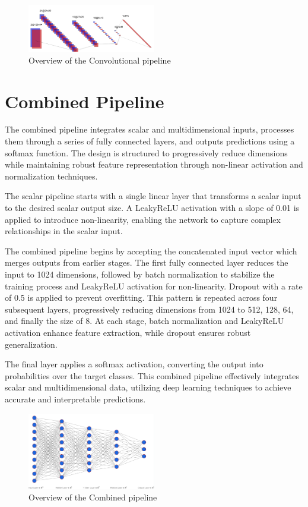 \documentclass[twocolumn]{article}
\begin{document}
\begin{figure}[h]
  \centering
  \includegraphics[width=0.5\textwidth]{Conv-Pipeline}
  \caption{Overview of the Convolutional pipeline}
  \label{fig:Conv-Pipeline}
\end{figure}

\section{Combined Pipeline}
The combined pipeline integrates scalar and multidimensional inputs, processes them through a series of fully connected layers, and outputs predictions using a softmax function. The design is structured to progressively reduce dimensions while maintaining robust feature representation through non-linear activation and normalization techniques.

The scalar pipeline starts with a single linear layer that transforms a scalar input to the desired scalar output size. A LeakyReLU activation with a slope of 0.01 is applied to introduce non-linearity, enabling the network to capture complex relationships in the scalar input.

The combined pipeline begins by accepting the concatenated input vector which merges outputs from earlier stages. The first fully connected layer reduces the input to 1024 dimensions, followed by batch normalization to stabilize the training process and LeakyReLU activation for non-linearity. Dropout with a rate of 0.5 is applied to prevent overfitting. This pattern is repeated across four subsequent layers, progressively reducing dimensions from 1024 to 512, 128, 64, and finally the size of 8. At each stage, batch normalization and LeakyReLU activation enhance feature extraction, while dropout ensures robust generalization.

The final layer applies a softmax activation, converting the output into probabilities over the target classes. This combined pipeline effectively integrates scalar and multidimensional data, utilizing deep learning techniques to achieve accurate and interpretable predictions.

\begin{figure}[h]
  \centering
  \includegraphics[width=0.5\textwidth]{Main Pipeline}
  \caption{Overview of the Combined pipeline}
  \label{fig:Main Pipeline}
\end{figure}
\end{document}
